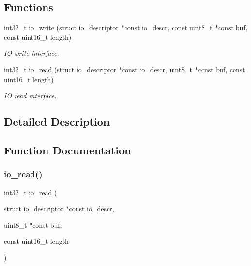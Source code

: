 \subsection*{Functions}
\begin{DoxyCompactItemize}
\item 
int32\+\_\+t \hyperlink{group__doc__driver__hal__helper__io_ga81aac60d5ce6feb0c44f8937d7c02f14}{io\+\_\+write} (struct \hyperlink{structio__descriptor}{io\+\_\+descriptor} $\ast$const io\+\_\+descr, const uint8\+\_\+t $\ast$const buf, const uint16\+\_\+t length)
\begin{DoxyCompactList}\small\item\em IO write interface. \end{DoxyCompactList}\item 
int32\+\_\+t \hyperlink{group__doc__driver__hal__helper__io_gaf5e8722129933fa8e014144fd7505be6}{io\+\_\+read} (struct \hyperlink{structio__descriptor}{io\+\_\+descriptor} $\ast$const io\+\_\+descr, uint8\+\_\+t $\ast$const buf, const uint16\+\_\+t length)
\begin{DoxyCompactList}\small\item\em IO read interface. \end{DoxyCompactList}\end{DoxyCompactItemize}


\subsection{Detailed Description}


\subsection{Function Documentation}
\mbox{\label{group__doc__driver__hal__helper__io_gaf5e8722129933fa8e014144fd7505be6}} 
\subsubsection{\texorpdfstring{io\+\_\+read()}{io\_read()}}
{\footnotesize\ttfamily int32\+\_\+t io\+\_\+read (\begin{DoxyParamCaption}\item[{struct \hyperlink{structio__descriptor}{io\+\_\+descriptor} $\ast$const}]{io\+\_\+descr,  }\item[{uint8\+\_\+t $\ast$const}]{buf,  }\item[{const uint16\+\_\+t}]{length }\end{DoxyParamCaption})}



